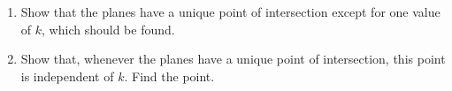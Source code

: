 \documentclass[leqno]{article}
\begin{document}
\begin{enumerate}[
  label=\textbf{\arabic*.},
  leftmargin=*,
  topsep=0pt,
  partopsep=0pt,
  parsep=0pt
]
\begin{enumerate}[label=\textbf{(\alph*)}]
  \item Show that the planes have a unique point of intersection except for one value of $k$, which should be found.  \\
  \item Show that, whenever the planes have a unique point of intersection, this point is independent of $k$. Find the point.  \\
\end{enumerate}
\end{enumerate}
\end{document}
